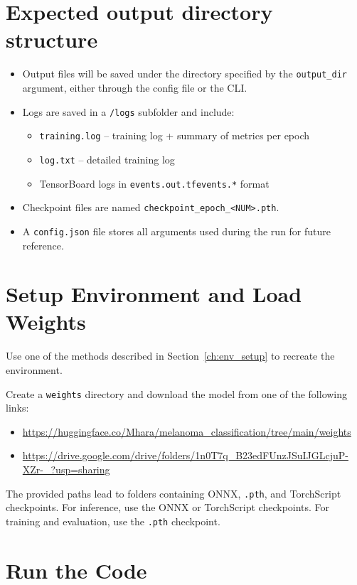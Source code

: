 \section{Expected output directory structure}
\begin{itemize}
    \item Output files will be saved under the directory specified by the \texttt{output\_dir} argument, either through the config file or the CLI.
    \item Logs are saved in a \texttt{/logs} subfolder and include:
    \begin{itemize}
        \item \texttt{training.log} – training log + summary of metrics per epoch
        \item \texttt{log.txt} – detailed training log
        \item TensorBoard logs in \texttt{events.out.tfevents.*} format
    \end{itemize}
    \item Checkpoint files are named \texttt{checkpoint\_epoch\_<NUM>.pth}.
    \item A \texttt{config.json} file stores all arguments used during the run for future reference.
\end{itemize}

\section{Setup Environment and Load Weights}
\label{sec:setup_env}

Use one of the methods described in Section~\ref{ch:env_setup} to recreate the environment.

Create a \texttt{weights} directory and download the model from one of the following links:
\begin{itemize}
    \item \url{https://huggingface.co/Mhara/melanoma_classification/tree/main/weights}
    \item \url{https://drive.google.com/drive/folders/1n0T7q_B23edFUnzJSuIJGLcjuP-XZr-_?usp=sharing}
\end{itemize}
The provided paths lead to folders containing ONNX, \texttt{.pth}, and TorchScript checkpoints. 
For inference, use the ONNX or TorchScript checkpoints. 
For training and evaluation, use the \texttt{.pth} checkpoint.


\section{Run the Code}

